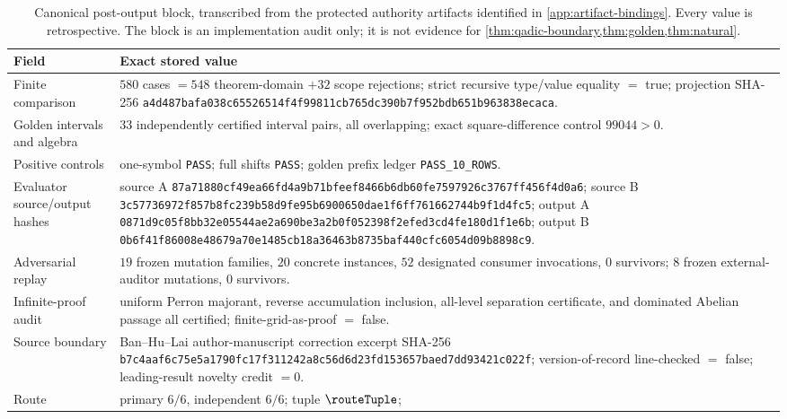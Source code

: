 \begin{table}[H]
\centering
\caption{Canonical post-output block, transcribed from the protected
authority artifacts identified in \cref{app:artifact-bindings}.  Every value
is retrospective.  The block is an implementation audit only; it is not
evidence for \cref{thm:qadic-boundary,thm:golden,thm:natural}.}
\label{tab:canonical-replay}
\scriptsize
\begin{tabularx}{\textwidth}{>{\raggedright\arraybackslash}p{3.15cm}
                            >{\raggedright\arraybackslash}X}
\toprule
Field & Exact stored value \\
\midrule
Finite comparison
  & \(580\) cases \(=548\) theorem-domain \(+32\) scope rejections;
    strict recursive type/value equality \(=\) true;
    projection SHA-256
    \nolinkurl{a4d487bafa038c65526514f4f99811cb765dc390b7f952bdb651b963838ecaca}. \\
Golden intervals and algebra
  & \(33\) independently certified interval pairs, all overlapping;
    exact square-difference control \(99044>0\). \\
Positive controls
  & one-symbol \texttt{PASS}; full shifts \texttt{PASS};
    golden prefix ledger \texttt{PASS\_10\_ROWS}. \\
Evaluator source/output hashes
  & source A
    \nolinkurl{87a71880cf49ea66fd4a9b71bfeef8466b6db60fe7597926c3767ff456f4d0a6};
    source B
    \nolinkurl{3c57736972f857b8fc239b58d9fe95b6900650dae1f6ff761662744b9f1d4fc5};
    output A
    \nolinkurl{0871d9c05f8bb32e05544ae2a690be3a2b0f052398f2efed3cd4fe180d1f1e6b};
    output B
    \nolinkurl{0b6f41f86008e48679a70e1485cb18a36463b8735baf440cfc6054d09b8898c9}. \\
Adversarial replay
  & \(19\) frozen mutation families, \(20\) concrete instances,
    \(52\) designated consumer invocations, \(0\) survivors;
    \(8\) frozen external-auditor mutations, \(0\) survivors. \\
Infinite-proof audit
  & uniform Perron majorant, reverse accumulation inclusion, all-level
    separation certificate, and dominated Abelian passage all certified;
    finite-grid-as-proof \(=\) false. \\
Source boundary
  & Ban--Hu--Lai author-manuscript correction excerpt SHA-256
    \nolinkurl{b7c4aaf6c75e5a1790fc17f311242a8c56d6d23fd153657baed7dd93421c022f};
    version-of-record line-checked \(=\) false;
    leading-result novelty credit \(=0\). \\
Route
  & primary \(6/6\), independent \(6/6\);
    tuple \(\routeTuple\);

\end{tabularx}
\end{table}

